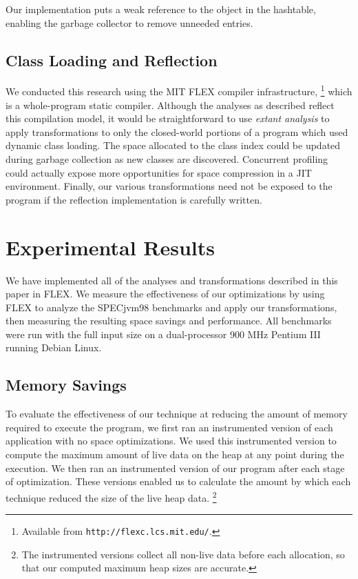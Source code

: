 \documentclass{sig-alt-full}
\begin{document}
Our implementation puts a weak reference to the object in the
hashtable, enabling the garbage collector to remove unneeded entries.
%
\subsection{Class Loading and Reflection}
We conducted this research using the MIT FLEX compiler infrastructure,%
\footnote{Available from {\tt http://flexc.lcs.mit.edu/}.} which is a
whole-program static compiler.  Although the analyses as described reflect
this compilation model, it would be straightforward to use
\emph{extant analysis}
\cite{sreedhar00} to apply transformations to only the closed-world
portions of a program which used dynamic class loading.  The space
allocated to the class index could be updated during garbage collection
as new classes are discovered.  Concurrent profiling could actually
expose more opportunities for space compression in a JIT environment.
Finally, our various transformations need not be exposed to the program if the
reflection implementation is carefully written.
%
\section{Experimental Results}
\label{sec:results}
%
We have implemented all of the analyses and transformations described
in this paper in FLEX.
We measure the effectiveness
of our optimizations by using FLEX to analyze the SPECjvm98 benchmarks
and apply our transformations,
then measuring the resulting space savings and
performance.   All benchmarks were run with the full input size
on a dual-processor 900 MHz
Pentium III running Debian Linux.
%
\subsection{Memory Savings}
%
To evaluate the effectiveness of our technique at reducing the
amount of memory required to execute the program, 
we first ran an instrumented version of each
application with no space optimizations. We used this
instrumented version to compute the maximum amount of live data on the
heap at any point during the execution.  
We then ran an instrumented version of our program after each stage of
optimization.
These versions enabled us to calculate the amount by which each 
technique reduced the size of the live heap data.%
\footnote{The instrumented versions collect all non-live data before
each allocation, so that our computed maximum heap sizes are accurate.}
\end{document}
